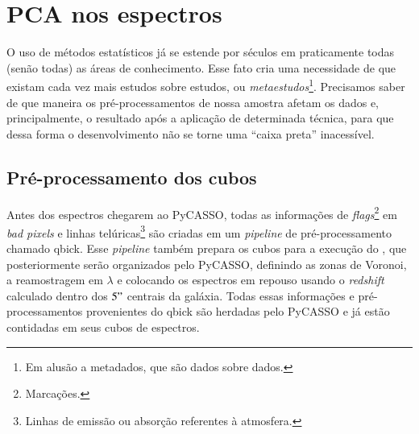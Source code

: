 



\chapter{PCA nos espectros}
\label{sec:UsoPCA}

O uso de métodos estatísticos já se estende por séculos em praticamente todas (senão todas) as áreas de conhecimento.
Esse fato cria uma necessidade de que existam cada vez mais estudos sobre estudos, ou {\em metaestudos}\footnote{Em
alusão a metadados, que são dados sobre dados.}. Precisamos saber de que maneira os pré-processamentos de nossa amostra
afetam os dados e, principalmente, o resultado após a aplicação de determinada técnica, para que dessa forma o
desenvolvimento não se torne uma ``caixa preta'' inacessível.

\section{Pré-processamento dos cubos}
\label{sec:UsoPCA:PCAlidades}

Antes dos espectros chegarem ao PyCASSO, todas as informações de {\em flags}\footnote{Marcações.} em {\em bad pixels} e
linhas telúricas\footnote{Linhas de emissão ou absorção referentes à atmosfera.} são criadas em um {\em pipeline} de
pré-processamento chamado {\sc qbick}. Esse {\em pipeline} também prepara os cubos para a execução do \starlight, que
posteriormente serão organizados pelo PyCASSO, definindo as zonas de Voronoi, a reamostragem em $\lambda$ e colocando os
espectros em repouso usando o {\em redshift} calculado dentro dos $5"$ centrais da galáxia. Todas essas informações e
pré-processamentos provenientes do {\sc qbick} são herdadas pelo PyCASSO e já estão contidadas em seus cubos de
espectros.

